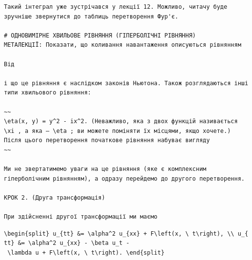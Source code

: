 \documentclass[
  ukrainian,
]{article}
\begin{document}
\begin{verbatim}
Такий інтеграл уже зустрічався у лекції 12. Можливо, читачу буде зручніше звернутися до таблиць перетворення Фур'є.

# ОДНОВИМІРНЕ ХВИЛЬОВЕ РІВНЯННЯ (ГІПЕРБОЛІЧНІ РІВНЯННЯ)
МЕТАЛЕКЦІЇ: Показати, що коливання навантаження описуються рівнянням

Від

і що це рівняння є наслідком законів Ньютона. Також розглядаються інші типи хвильового рівняння:

~~
\eta(x, y) = y^2 - ix^2. (Неважливо, яка з двох функцій називається \xi , а яка — \eta ; ви можете поміняти їх місцями, якщо хочете.) Після цього перетворення початкове рівняння набуває вигляду
~~

Ми не звертатимемо уваги на це рівняння (яке є комплексним гіперболічним рівнянням), а одразу перейдемо до другого перетворення.

КРОК 2. (Друга трансформація)

При здійсненні другої трансформації ми маємо
\end{verbatim}

\texttt{\textbackslash{}begin\{split\}\ u\_\{tt\}\ \&=\ \textbackslash{}alpha\^{}2\ u\_\{xx\}\ +\ F\textbackslash{}left(x,\ \textbackslash{}\ t\textbackslash{}right),\ \textbackslash{}\textbackslash{}\ u\_\{tt\}\ \&=\ \textbackslash{}alpha\^{}2\ u\_\{xx\}\ -\ \textbackslash{}beta\ u\_t\ -\ \textbackslash{}lambda\ u\ +\ F\textbackslash{}left(x,\ \textbackslash{}\ t\textbackslash{}right).\ \textbackslash{}end\{split\}}
\end{document}
